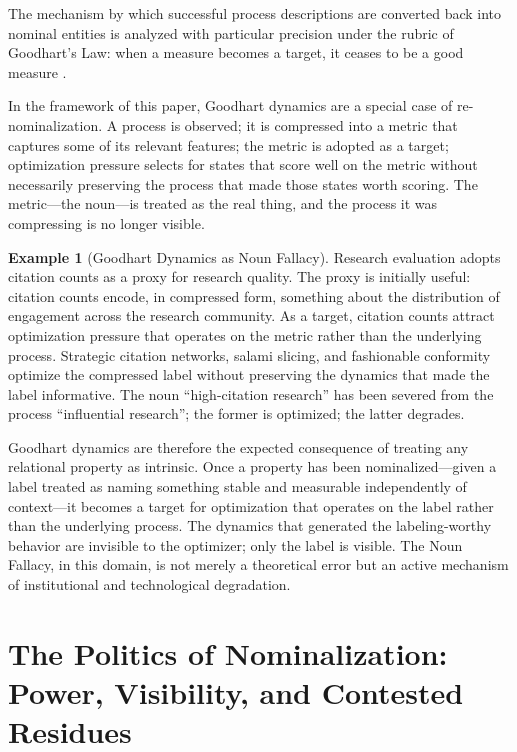 \documentclass[12pt, a4paper]{article}
\theoremstyle{plain}
\theoremstyle{definition}
\newtheorem{example}[theorem]{Example}
\theoremstyle{remark}
\begin{document}
The mechanism by which successful process descriptions are converted back
into nominal entities is analyzed with particular precision under the rubric
of Goodhart's Law: when a measure becomes a target, it ceases to be a good
measure \citep{goodhart1984,strathern1997}.

In the framework of this paper, Goodhart dynamics are a special case of
re-nominalization. A process is observed; it is compressed into a metric
that captures some of its relevant features; the metric is adopted as a
target; optimization pressure selects for states that score well on the
metric without necessarily preserving the process that made those states
worth scoring. The metric---the noun---is treated as the real thing, and
the process it was compressing is no longer visible.

\begin{example}[Goodhart Dynamics as Noun Fallacy]
Research evaluation adopts citation counts as a proxy for research quality.
The proxy is initially useful: citation counts encode, in compressed form,
something about the distribution of engagement across the research community.
As a target, citation counts attract optimization pressure that operates on
the metric rather than the underlying process. Strategic citation networks,
salami slicing, and fashionable conformity optimize the compressed label
without preserving the dynamics that made the label informative. The noun
``high-citation research'' has been severed from the process
``influential research''; the former is optimized; the latter degrades.
\end{example}

Goodhart dynamics are therefore the expected consequence of treating any
relational property as intrinsic. Once a property has been nominalized---given
a label treated as naming something stable and measurable independently of
context---it becomes a target for optimization that operates on the label
rather than the underlying process. The dynamics that generated the
labeling-worthy behavior are invisible to the optimizer; only the label
is visible. The Noun Fallacy, in this domain, is not merely a theoretical
error but an active mechanism of institutional and technological degradation.

\section{The Politics of Nominalization: Power, Visibility, and Contested Residues}
\label{sec:politics}
\end{document}
